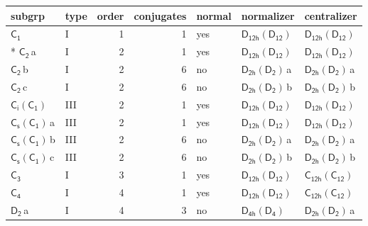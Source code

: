 \documentclass[10pt,a4paper]{article}
\numberwithin{equation}{section}
\newcommand{\grp}[1]{\mathsf{#1}}
\newcommand{\clsletter}[1]{\,{\scriptsize\color{black!55}#1}}
\begin{document}
{\small\begin{longtable}{@{}llrrlll@{}}\toprule
subgrp & type & order & conjugates & normal & normalizer & centralizer\\\midrule\endhead
\bottomrule\endfoot\endlastfoot
\href{../../../rotation/data/pdf/C1.pdf}{$\grp{C_{1}}$} & I & 1 & 1 & yes & \href{D12h-D12.pdf}{$\grp{D_{12h}}(\grp{D_{12}})$} & \href{D12h-D12.pdf}{$\grp{D_{12h}}(\grp{D_{12}})$}\\*
\href{../../../rotation/data/pdf/C2.pdf}{$\grp{C_{2}}$}\clsletter{a} & I & 2 & 1 & yes & \href{D12h-D12.pdf}{$\grp{D_{12h}}(\grp{D_{12}})$} & \href{D12h-D12.pdf}{$\grp{D_{12h}}(\grp{D_{12}})$}\\
\href{../../../rotation/data/pdf/C2.pdf}{$\grp{C_{2}}$}\clsletter{b} & I & 2 & 6 & no & \href{D2h-D2.pdf}{$\grp{D_{2h}}(\grp{D_{2}})$}\clsletter{a} & \href{D2h-D2.pdf}{$\grp{D_{2h}}(\grp{D_{2}})$}\clsletter{a}\\
\href{../../../rotation/data/pdf/C2.pdf}{$\grp{C_{2}}$}\clsletter{c} & I & 2 & 6 & no & \href{D2h-D2.pdf}{$\grp{D_{2h}}(\grp{D_{2}})$}\clsletter{b} & \href{D2h-D2.pdf}{$\grp{D_{2h}}(\grp{D_{2}})$}\clsletter{b}\\
\href{S2-C1.pdf}{$\grp{C_{i}}(\grp{C_{1}})$} & III & 2 & 1 & yes & \href{D12h-D12.pdf}{$\grp{D_{12h}}(\grp{D_{12}})$} & \href{D12h-D12.pdf}{$\grp{D_{12h}}(\grp{D_{12}})$}\\
\href{C1v-C1.pdf}{$\grp{C_{s}}(\grp{C_{1}})$}\clsletter{a} & III & 2 & 1 & yes & \href{D12h-D12.pdf}{$\grp{D_{12h}}(\grp{D_{12}})$} & \href{D12h-D12.pdf}{$\grp{D_{12h}}(\grp{D_{12}})$}\\
\href{C1v-C1.pdf}{$\grp{C_{s}}(\grp{C_{1}})$}\clsletter{b} & III & 2 & 6 & no & \href{D2h-D2.pdf}{$\grp{D_{2h}}(\grp{D_{2}})$}\clsletter{a} & \href{D2h-D2.pdf}{$\grp{D_{2h}}(\grp{D_{2}})$}\clsletter{a}\\
\href{C1v-C1.pdf}{$\grp{C_{s}}(\grp{C_{1}})$}\clsletter{c} & III & 2 & 6 & no & \href{D2h-D2.pdf}{$\grp{D_{2h}}(\grp{D_{2}})$}\clsletter{b} & \href{D2h-D2.pdf}{$\grp{D_{2h}}(\grp{D_{2}})$}\clsletter{b}\\
\href{../../../rotation/data/pdf/C3.pdf}{$\grp{C_{3}}$} & I & 3 & 1 & yes & \href{D12h-D12.pdf}{$\grp{D_{12h}}(\grp{D_{12}})$} & \href{C12h-C12.pdf}{$\grp{C_{12h}}(\grp{C_{12}})$}\\
\href{../../../rotation/data/pdf/C4.pdf}{$\grp{C_{4}}$} & I & 4 & 1 & yes & \href{D12h-D12.pdf}{$\grp{D_{12h}}(\grp{D_{12}})$} & \href{C12h-C12.pdf}{$\grp{C_{12h}}(\grp{C_{12}})$}\\
\href{../../../rotation/data/pdf/D2.pdf}{$\grp{D_{2}}$}\clsletter{a} & I & 4 & 3 & no & \href{D4h-D4.pdf}{$\grp{D_{4h}}(\grp{D_{4}})$} & \href{D2h-D2.pdf}{$\grp{D_{2h}}(\grp{D_{2}})$}\clsletter{a}\\

\end{longtable}}
\end{document}
